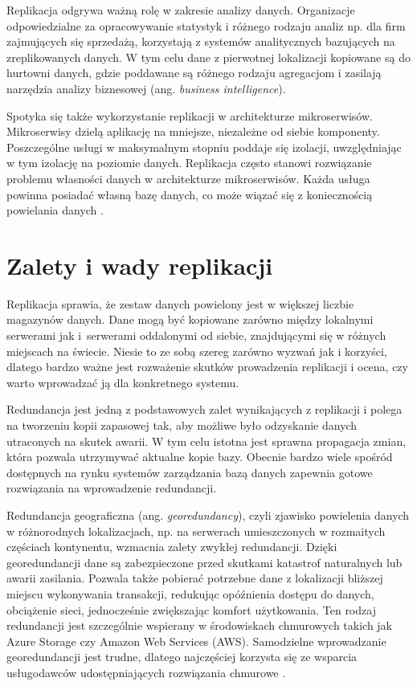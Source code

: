 \documentclass[a4paper,twoside,12pt]{book}
\newcommand{\obcy}[1]{\emph{#1}}
\newcommand{\ang}[1]{{\selectlanguage{british}\obcy{#1}}}
\begin{document}
Replikacja odgrywa ważną rolę w zakresie analizy danych. Organizacje odpowiedzialne za opracowywanie statystyk i różnego rodzaju analiz np. dla firm zajmujących się sprzedażą, korzystają z systemów analitycznych bazujących na zreplikowanych danych. W tym celu dane z pierwotnej lokalizacji kopiowane są do hurtowni danych, gdzie poddawane są różnego rodzaju agregacjom i zasilają narzędzia analizy biznesowej (ang. \ang{business intelligence}).

Spotyka się także wykorzystanie replikacji w architekturze mikroserwisów. Mikroserwisy dzielą aplikację na mniejsze, niezależne od siebie komponenty. Poszczególne usługi w maksymalnym stopniu poddaje się izolacji, uwzględniając w tym izolację na poziomie danych. Replikacja często stanowi rozwiązanie problemu własności danych w architekturze mikroserwisów. Każda usługa powinna posiadać własną bazę danych, co może wiązać się z koniecznością powielania danych \cite{bib:event-driven-microservices}.

\section{Zalety i wady replikacji}

Replikacja sprawia, że zestaw danych powielony jest w większej liczbie magazynów danych. Dane mogą być kopiowane zarówno między lokalnymi serwerami jak i~serwerami oddalonymi od siebie, znajdującymi się w różnych miejscach na świecie. Niesie to ze sobą szereg zarówno wyzwań jak i korzyści, dlatego bardzo ważne jest rozważenie skutków prowadzenia replikacji i ocena, czy warto wprowadzać ją dla konkretnego systemu.

Redundancja jest jedną z podstawowych zalet wynikających z replikacji i polega na tworzeniu kopii zapasowej tak, aby możliwe było odzyskanie danych utraconych na skutek awarii. W tym celu istotna jest sprawna propagacja zmian, która pozwala utrzymywać aktualne kopie bazy. Obecnie bardzo wiele spośród dostępnych na rynku systemów zarządzania bazą danych zapewnia gotowe rozwiązania na wprowadzenie redundancji.

Redundancja geograficzna (ang. \ang{georedundancy}), czyli zjawisko powielenia danych w różnorodnych lokalizacjach, np. na serwerach umieszczonych w rozmaitych częściach kontynentu, wzmacnia zalety zwykłej redundancji. Dzięki georedundancji dane są zabezpieczone przed skutkami katastrof naturalnych lub awarii zasilania. Pozwala także pobierać potrzebne dane z lokalizacji bliższej miejscu wykonywania transakcji, redukując opóźnienia dostępu do danych, obciążenie sieci, jednocześnie zwiększając komfort użytkowania. Ten rodzaj redundancji jest szczególnie wspierany w środowiskach chmurowych takich jak Azure Storage czy Amazon Web Services (AWS). Samodzielne wprowadzanie georedundancji jest trudne, dlatego najczęściej korzysta się ze wsparcia usługodawców udostępniających rozwiązania chmurowe \cite{bib:migrating-application-data-to-the-cloud-using-cloud-data-patterns}.
\end{document}
